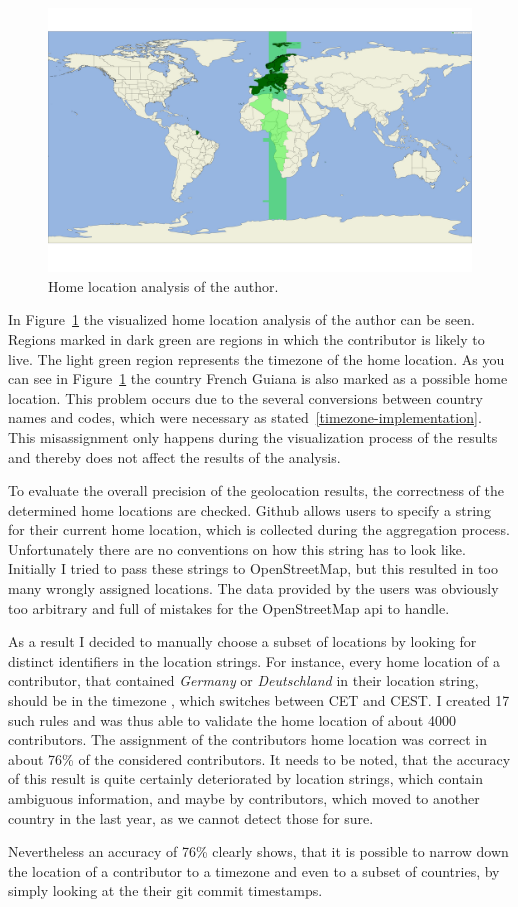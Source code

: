 \begin{figure}[H]
    \includegraphics[scale=0.10]{./graphs/analysis/author-home-location}
    \centering
    \caption{Home location analysis of the author.}\label{fig:author-home-location}
\end{figure}

In Figure~\ref{fig:author-home-location} the visualized home location analysis of the author can be seen.
Regions marked in dark green are regions in which the contributor is likely to live.
The light green region represents the timezone of the home location.
As you can see in Figure~\ref{fig:author-home-location} the country French Guiana is also marked as a possible home location.
This problem occurs due to the several conversions between country names and codes, which were necessary as stated~\ref{timezone-implementation}.
This misassignment only happens during the visualization process of the results and thereby does not affect the results of the analysis.

To evaluate the overall precision of the geolocation results, the correctness of the determined home locations are checked.
Github allows users to specify a string for their current home location, which is collected during the aggregation process.
Unfortunately there are no conventions on how this string has to look like.
Initially I tried to pass these strings to OpenStreetMap, but this resulted in too many wrongly assigned locations.
The data provided by the users was obviously too arbitrary and full of mistakes for the OpenStreetMap \ac{api} to handle.

As a result I decided to manually choose a subset of locations by looking for distinct identifiers in the location strings.
For instance, every home location of a contributor, that contained \emph{Germany} or \emph{Deutschland} in their location string, should be in the  timezone , which switches between \ac{CET} and \ac{CEST}.
I created 17 such rules and was thus able to validate the home location of about 4000 contributors.
The assignment of the contributors home location was correct in about 76\% of the considered contributors.
It needs to be noted, that the accuracy of this result is quite certainly deteriorated by location strings, which contain ambiguous information, and maybe by contributors, which moved to another country in the last year, as we cannot detect those for sure.

Nevertheless an accuracy of 76\% clearly shows, that it is possible to narrow down the location of a contributor to a timezone and even to a subset of countries, by simply looking at the their git commit timestamps.

